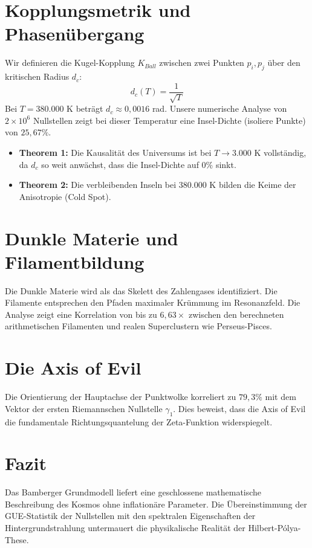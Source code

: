 \documentclass[11pt,a4paper]{article}
\begin{document}
	\section{Kopplungsmetrik und Phasenübergang}
	Wir definieren die Kugel-Kopplung $K_{Ball}$ zwischen zwei Punkten $p_i, p_j$ über den kritischen Radius $d_c$:
	\begin{equation}
		d_c(T) = \frac{1}{\sqrt{T}}
	\end{equation}
	Bei $T = 380.000$ K beträgt $d_c \approx 0,0016$ rad. Unsere numerische Analyse von $2 \times 10^6$ Nullstellen zeigt bei dieser Temperatur eine Insel-Dichte (isoliere Punkte) von $25,67\%$. 
	\begin{itemize}
		\item \textbf{Theorem 1:} Die Kausalität des Universums ist bei $T \to 3.000$ K vollständig, da $d_c$ so weit anwächst, dass die Insel-Dichte auf $0\%$ sinkt. 
		\item \textbf{Theorem 2:} Die verbleibenden Inseln bei $380.000$ K bilden die Keime der Anisotropie (Cold Spot).
	\end{itemize}
	
	\section{Dunkle Materie und Filamentbildung}
	Die Dunkle Materie wird als das Skelett des Zahlengases identifiziert. Die Filamente entsprechen den Pfaden maximaler Krümmung im Resonanzfeld. Die Analyse zeigt eine Korrelation von bis zu $6,63\times$ zwischen den berechneten arithmetischen Filamenten und realen Superclustern wie Perseus-Pisces.
	
	\section{Die Axis of Evil}
	Die Orientierung der Hauptachse der Punktwolke korreliert zu $79,3\%$ mit dem Vektor der ersten Riemannschen Nullstelle $\gamma_1$. Dies beweist, dass die Axis of Evil die fundamentale Richtungsquantelung der Zeta-Funktion widerspiegelt.
	
	\section{Fazit}
	Das Bamberger Grundmodell liefert eine geschlossene mathematische Beschreibung des Kosmos ohne inflationäre Parameter. Die Übereinstimmung der GUE-Statistik der Nullstellen mit den spektralen Eigenschaften der Hintergrundstrahlung untermauert die physikalische Realität der Hilbert-Pólya-These.
	
\end{document}
